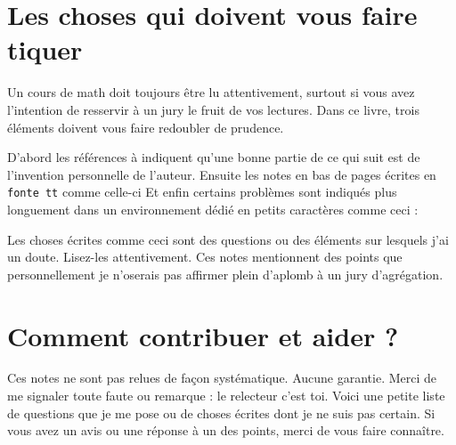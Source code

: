 
\section{Les choses qui doivent vous faire tiquer}

Un cours de math doit toujours être lu attentivement, surtout si vous avez l'intention de resservir à un jury le fruit de vos lectures. Dans ce livre, trois éléments doivent vous faire redoubler de prudence.

D'abord les références à \cite{MonCerveau} indiquent qu'une bonne partie de ce qui suit est de l'invention personnelle de l'auteur. Ensuite les notes en bas de pages écrites en \texttt{fonte tt} comme celle-ci Et enfin certains problèmes sont indiqués plus longuement dans un environnement dédié en petits caractères comme ceci :
\begin{probleme}
    Les choses écrites comme ceci sont des questions ou des éléments sur lesquels j'ai un doute. Lisez-les attentivement. Ces notes mentionnent des points que personnellement je n'oserais pas affirmer plein d'aplomb à un jury d'agrégation.
\end{probleme}

\section{Comment contribuer et aider ?}
\label{SecooCKWWooBFgnea}

Ces notes ne sont pas relues de façon systématique. Aucune garantie. Merci de me signaler toute faute ou remarque : le relecteur c'est toi. Voici une petite liste de questions que je me pose ou de choses écrites dont je ne suis pas certain. Si vous avez un avis ou une réponse à un des points, merci de vous faire connaître.

